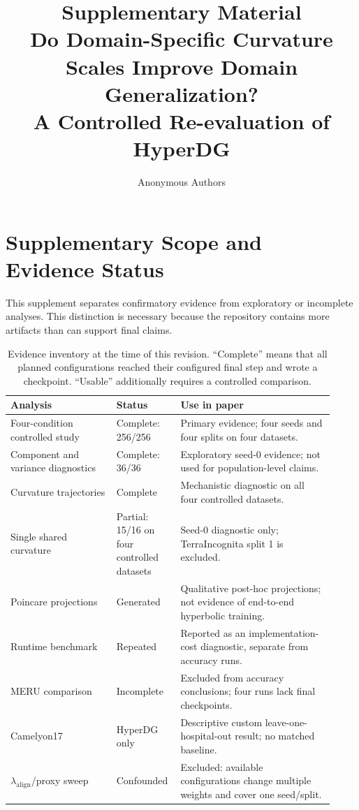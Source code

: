 \documentclass[10pt]{article}
\title{Supplementary Material\\
\large Do Domain-Specific Curvature Scales Improve Domain Generalization?\\
A Controlled Re-evaluation of HyperDG}
\author{Anonymous Authors}
\date{}
\begin{document}
\maketitle
\vspace{-1.5em}

\section{Supplementary Scope and Evidence Status}
\label{sec:scope}

This supplement separates confirmatory evidence from exploratory or incomplete
analyses. This distinction is necessary because the repository contains more
artifacts than can support final claims.

\begin{table}[H]
\centering
\caption{Evidence inventory at the time of this revision. ``Complete'' means
that all planned configurations reached their configured final step and wrote a
checkpoint. ``Usable'' additionally requires a controlled comparison.}
\label{tab:evidence-status}
\begin{tabular}{p{0.31\linewidth}p{0.16\linewidth}p{0.45\linewidth}}
\toprule
Analysis & Status & Use in paper \\
\midrule
Four-condition controlled study & Complete: 256/256 & Primary evidence; four seeds and four splits on four datasets. \\
Component and variance diagnostics & Complete: 36/36 & Exploratory seed-0 evidence; not used for population-level claims. \\
Curvature trajectories & Complete & Mechanistic diagnostic on all four controlled datasets. \\
Single shared curvature & Partial: 15/16 on four controlled datasets & Seed-0 diagnostic only; TerraIncognita split 1 is excluded. \\
Poincare projections & Generated & Qualitative post-hoc projections; not evidence of end-to-end hyperbolic training. \\
Runtime benchmark & Repeated & Reported as an implementation-cost diagnostic, separate from accuracy runs. \\
MERU comparison & Incomplete & Excluded from accuracy conclusions; four runs lack final checkpoints. \\
Camelyon17 & HyperDG only & Descriptive custom leave-one-hospital-out result; no matched baseline. \\
$\lambda_{\mathrm{align}}$/proxy sweep & Confounded & Excluded: available configurations change multiple weights and cover one seed/split. \\
\bottomrule
\end{tabular}
\end{table}
\end{document}
